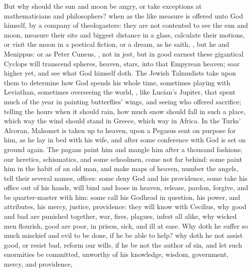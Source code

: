 {But why should the sun and moon be angry, or take exceptions at
mathematicians and philosophers? when as the like measure is offered
unto God himself, by a company of theologasters: they are not contented
to see the sun and moon, measure their site and biggest distance in a
glass, calculate their motions, or visit the moon in a poetical
fiction, or a dream, as he saith, , but he and Menippus: or as Peter Cuneus, , not in jest, but in good earnest these gigantical Cyclops will
transcend spheres, heaven, stars, into that Empyrean heaven; soar
higher yet, and see what God himself doth. The Jewish Talmudists take
upon them to determine how God spends his whole time, sometimes playing
with Leviathan, sometimes overseeing the world, \etc{}, like Lucian's
Jupiter, that spent much of the year in painting butterflies' wings,
and seeing who offered sacrifice; telling the hours when it should
rain, how much snow should fall in such a place, which way the wind
should stand in Greece, which way in Africa. In the Turks' Alcoran,
Mahomet is taken up to heaven, upon a Pegasus sent on purpose for him,
as he lay in bed with his wife, and after some conference with God is
set on ground again. The pagans paint him and mangle him after a
thousand fashions; our heretics, schismatics, and some schoolmen, come
not far behind: some paint him in the habit of an old man, and make
maps of heaven, number the angels, tell their several names,
offices: some deny God and his providence, some take his office out of
his hands, will bind and loose in heaven, release, pardon,
forgive, and be quarter-master with him: some call his Godhead in
question, his power, and attributes, his mercy, justice, providence:
they will know with Cecilius, why good and bad are punished
together, war, fires, plagues, infest all alike, why wicked men
flourish, good are poor, in prison, sick, and ill at ease. Why doth he
suffer so much mischief and evil to be done, if he be able to
help? why doth he not assist good, or resist bad, reform our wills, if
he be not the author of sin, and let such enormities be committed,
unworthy of his knowledge, wisdom, government, mercy, and providence,
}
